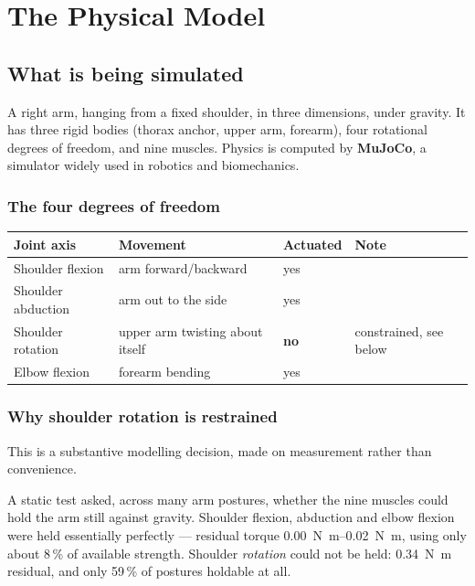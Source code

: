 \chapter{The Physical Model}

\section{What is being simulated}

A right arm, hanging from a fixed shoulder, in three dimensions, under gravity.
It has three rigid bodies (thorax anchor, upper arm, forearm), four rotational
degrees of freedom, and nine muscles. Physics is computed by \textbf{MuJoCo}, a
simulator widely used in robotics and biomechanics.

\subsection{The four degrees of freedom}

\begin{center}
\begin{tabular}{@{} L{3.8cm} L{5.6cm} C{2.4cm} L{3.4cm} @{}}
\toprule
\textbf{Joint axis} & \textbf{Movement} & \textbf{Actuated} & \textbf{Note} \\
\midrule
Shoulder flexion   & arm forward/backward & yes & \\
Shoulder abduction & arm out to the side  & yes & \\
Shoulder rotation  & upper arm twisting about itself & \textbf{no} & constrained, see below \\
Elbow flexion      & forearm bending      & yes & \\
\bottomrule
\end{tabular}
\end{center}

\subsection{Why shoulder rotation is restrained}

This is a substantive modelling decision, made on measurement rather than
convenience.

A static test asked, across many arm postures, whether the nine muscles could
hold the arm still against gravity. Shoulder flexion, abduction and elbow flexion
were held essentially perfectly --- residual torque \SIrange{0.00}{0.02}{\newton\meter},
using only about 8\,\% of available strength. Shoulder \emph{rotation} could not
be held: \SI{0.34}{\newton\meter} residual, and only 59\,\% of postures holdable
at all.


